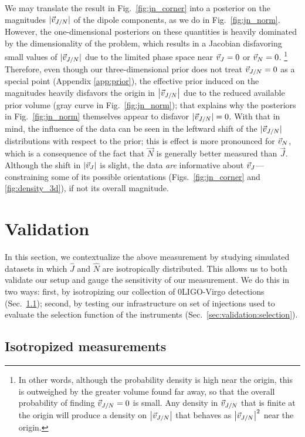 \documentclass[aps,prd,twocolumn,superscriptaddress,preprintnumbers,floatfix,nofootinbib]{revtex4-2}
\newcommand{\Nevents}{0}
\begin{document}
We may translate the result in Fig.~\ref{fig:jn_corner} into a posterior on the magnitudes $|\vec{v}_{J/N}|$ of the dipole components, as we do in Fig.~\ref{fig:jn_norm}.
However, the one-dimensional posteriors on these quantities is heavily dominated by the dimensionality of the problem, which results in a Jacobian disfavoring small values of $|\vec{v}_{J/N}|$ due to the limited phase space near $\vec{v}_{J}=0$ or $\vec{v}_{N} = 0$.%
\footnote{In other words, although the probability density is high near the origin, this is outweighed by the greater volume found far away, so that the overall probability of finding $\vec{v}_{J/N}=0$ is small.  Any density in $\vec{v}_{J/N}$ that is finite at the origin will produce a density on $\left| \vec{v}_{J/N} \right|$ that behaves as $\left| \vec{v}_{J/N} \right|^2$ near the origin.}
Therefore, even though our three-dimensional prior does not treat $\vec{v}_{J/N} = 0$ as a special point (Appendix \ref{app:prior}), the effective prior induced on the magnitudes heavily disfavors the origin in $\left| \vec{v}_{J/N} \right|$ due to the reduced available prior volume (gray curve in Fig.~\ref{fig:jn_norm}); that explains why the posteriors in Fig.~\ref{fig:jn_norm} themselves appear to disfavor $|\vec{v}_{J/N}| = 0$.
With that in mind, the influence of the data can be seen in the leftward shift of the $|\vec{v}_{J/N}|$ distributions with respect to the prior; this is effect is more pronounced for $\vec{v}_{N}$, which is a consequence of the fact that $\vec{N}$ is generally better measured than $\vec{J}$.
Although the shift in $|\vec{v}_{J}|$ is slight, the data \emph{are} informative about $\vec{v}_{J}$---constraining some of its possible orientations (Figs.~\ref{fig:jn_corner} and \ref{fig:density_3d}), if not its overall magnitude.

\section{Validation}
\label{sec:validation}

In this section, we contextualize the above measurement by studying simulated datasets in which $\hat{J}$ and $\hat{N}$ are isotropically distributed.
This allows us to both validate our setup and gauge the sensitivity of our measurement.
We do this in two ways: first, by isotropizing our collection of \Nevents LIGO-Virgo detections (Sec.~\ref{sec:validation:isotropized}); second, by testing our infrastructure on set of injections used to evaluate the selection function of the instruments (Sec.~\ref{sec:validation:selection}).

\subsection{Isotropized measurements}
\label{sec:validation:isotropized}
\end{document}
